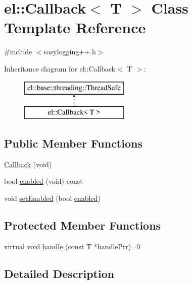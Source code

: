 \hypertarget{classel_1_1_callback}{}\section{el\+:\+:Callback$<$ T $>$ Class Template Reference}
\label{classel_1_1_callback}


{\ttfamily \#include $<$easylogging++.\+h$>$}

Inheritance diagram for el\+:\+:Callback$<$ T $>$\+:\begin{figure}[H]
\begin{center}
\leavevmode
\includegraphics[height=2.000000cm]{classel_1_1_callback}
\end{center}
\end{figure}
\subsection*{Public Member Functions}
\begin{DoxyCompactItemize}
\item 
\hyperlink{classel_1_1_callback_a58b0b0516f68247681a6a5da21a9d953}{Callback} (void)
\item 
bool \hyperlink{classel_1_1_callback_a1e3089fd19a11965e7b98bd423116bbd}{enabled} (void) const 
\item 
void \hyperlink{classel_1_1_callback_a05e68cb0b5ea4423913fa2ec4ea306b4}{set\+Enabled} (bool \hyperlink{classel_1_1_callback_a1e3089fd19a11965e7b98bd423116bbd}{enabled})
\end{DoxyCompactItemize}
\subsection*{Protected Member Functions}
\begin{DoxyCompactItemize}
\item 
virtual void \hyperlink{classel_1_1_callback_a8997c7971d65062c374ef24e653061be}{handle} (const T $\ast$handle\+Ptr)=0
\end{DoxyCompactItemize}


\subsection{Detailed Description}
